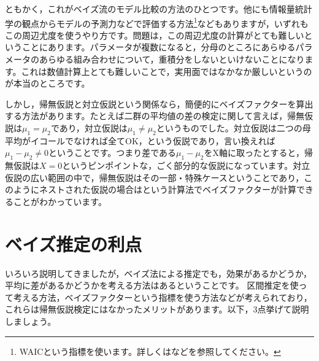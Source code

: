\documentclass{ltjbook}
\begin{document}
ともかく，これがベイズ流のモデル比較の方法のひとつです。他にも情報量統計学の観点からモデルの予測力などで評価する方法\footnote{WAICという指標を使います。詳しくは\citet{浜田201912}などを参照してください。}などもありますが，いずれもこの周辺尤度を使うやり方です。問題は，この周辺尤度の計算がとても難しいということにあります。パラメータが複数になると，分母のところにあらゆるパラメータのあらゆる組み合わせについて，重積分をしないといけないことになります。これは数値計算上とても難しいことで，実用面ではなかなか厳しいというのが本当のところです。

しかし，帰無仮説と対立仮説という関係なら，簡便的にベイズファクターを算出する方法があります。たとえば二群の平均値の差の検定に関して言えば，帰無仮説は$\mu_1=\mu_2$であり，対立仮説は$\mu_1 \neq \mu_2$というものでした。対立仮説は二つの母平均がイコールでなければ全てOK，という仮説であり，言い換えれば$\mu_1-\mu_2\neq 0$ということです。つまり差である$\mu_1-\mu_2$をX軸に取ったとすると，帰無仮説は$X=0$というピンポイントな，ごく部分的な仮説になっています。対立仮説の広い範囲の中で，帰無仮説はその一部・特殊ケースということであり，このようにネストされた仮説の場合は\citep{Lee201709}という計算法でベイズファクターが計算できることがわかっています。

\section{ベイズ推定の利点}
いろいろ説明してきましたが，ベイズ法による推定でも，効果があるかどうか，平均に差があるかどうかを考える方法はあるということです。
区間推定を使って考える方法，ベイズファクターという指標を使う方法などが考えられており，これらは帰無仮説検定にはなかったメリットがあります。以下，3点挙げて説明しましょう。
\end{document}

